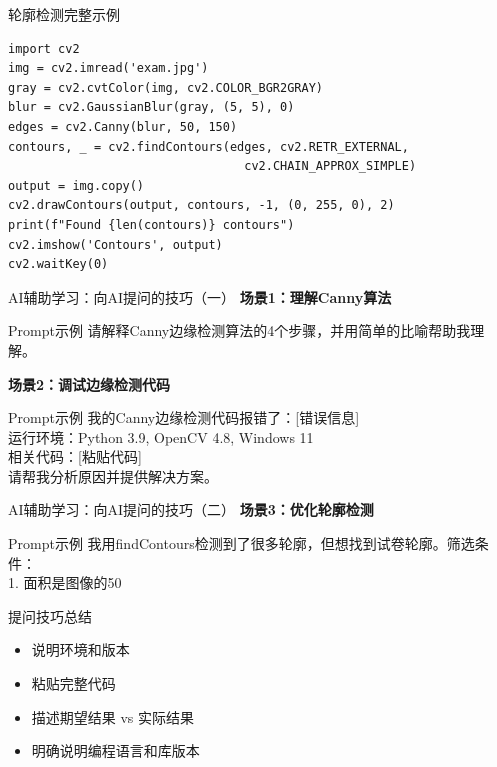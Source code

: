 \begin{frame}[fragile]{轮廓检测完整示例}
    \begin{lstlisting}[basicstyle=\ttfamily\small]
import cv2
img = cv2.imread('exam.jpg')
gray = cv2.cvtColor(img, cv2.COLOR_BGR2GRAY)
blur = cv2.GaussianBlur(gray, (5, 5), 0)
edges = cv2.Canny(blur, 50, 150)
contours, _ = cv2.findContours(edges, cv2.RETR_EXTERNAL,
                                 cv2.CHAIN_APPROX_SIMPLE)
output = img.copy()
cv2.drawContours(output, contours, -1, (0, 255, 0), 2)
print(f"Found {len(contours)} contours")
cv2.imshow('Contours', output)
cv2.waitKey(0)
    \end{lstlisting}

\end{frame}

\begin{frame}{AI辅助学习：向AI提问的技巧（一）}
    \textbf{场景1：理解Canny算法}
    \begin{exampleblock}{Prompt示例}
        请解释Canny边缘检测算法的4个步骤，并用简单的比喻帮助我理解。
    \end{exampleblock}

    \vspace{0.3cm}

    \textbf{场景2：调试边缘检测代码}
    \begin{exampleblock}{Prompt示例}
        我的Canny边缘检测代码报错了：[错误信息] \\
        运行环境：Python 3.9, OpenCV 4.8, Windows 11 \\
        相关代码：[粘贴代码] \\
        请帮我分析原因并提供解决方案。
    \end{exampleblock}
\end{frame}

\begin{frame}{AI辅助学习：向AI提问的技巧（二）}
    \textbf{场景3：优化轮廓检测}
    \begin{exampleblock}{Prompt示例}
        我用findContours检测到了很多轮廓，但想找到试卷轮廓。筛选条件：\\
        1. 面积是图像的50%
    \end{exampleblock}

    \vspace{0.4cm}

    \begin{block}{提问技巧总结}
        \begin{itemize}
            \item 说明环境和版本
            \item 粘贴完整代码
            \item 描述期望结果 vs 实际结果
            \item 明确说明编程语言和库版本
        \end{itemize}
    \end{block}
\end{frame}

